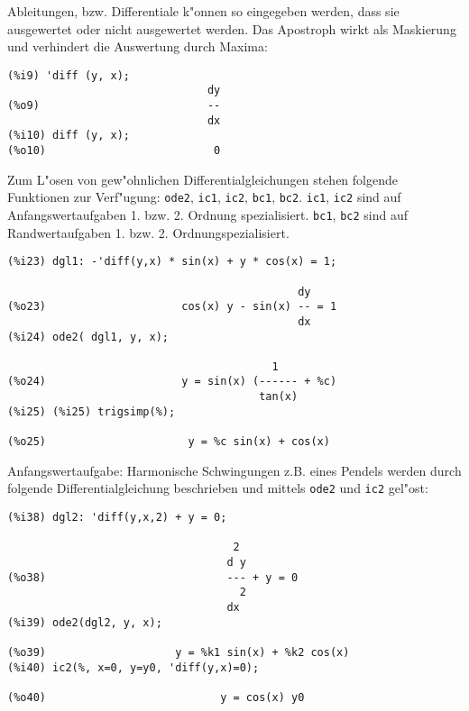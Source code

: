\documentclass[spanish,12pt,a4paper]{article}
\begin{document}
Ableitungen, bzw. Differentiale k"onnen so eingegeben werden, dass sie ausgewertet oder nicht ausgewertet werden. Das Apostroph wirkt als Maskierung und verhindert die Auswertung durch Maxima:

\scriptsize
\begin{verbatim}
(%i9) 'diff (y, x);
                               dy
(%o9)                          --
                               dx
(%i10) diff (y, x);
(%o10)                          0
\end{verbatim}
\normalsize

Zum L"osen von gew"ohnlichen Differentialgleichungen stehen folgende Funktionen zur Verf"ugung: \verb|ode2|, \verb|ic1|, \verb|ic2|, \verb|bc1|, \verb|bc2|.
\verb|ic1|, \verb|ic2| sind auf Anfangswertaufgaben 1. bzw. 2. Ordnung spezialisiert.
\verb|bc1|, \verb|bc2| sind auf Randwertaufgaben 1. bzw. 2. Ordnungspezialisiert.

\scriptsize
\begin{verbatim}
(%i23) dgl1: -'diff(y,x) * sin(x) + y * cos(x) = 1;

                                             dy
(%o23)                     cos(x) y - sin(x) -- = 1
                                             dx
(%i24) ode2( dgl1, y, x);

                                         1
(%o24)                     y = sin(x) (------ + %c)
                                       tan(x)
(%i25) (%i25) trigsimp(%);

(%o25)                      y = %c sin(x) + cos(x)
\end{verbatim}
\normalsize

Anfangswertaufgabe: Harmonische Schwingungen z.B. eines Pendels werden durch folgende Differentialgleichung beschrieben und mittels \verb|ode2| und \verb|ic2| gel"ost:

\scriptsize
\begin{verbatim}
(%i38) dgl2: 'diff(y,x,2) + y = 0;

                                   2
                                  d y
(%o38)                            --- + y = 0
                                    2
                                  dx
(%i39) ode2(dgl2, y, x);

(%o39)                    y = %k1 sin(x) + %k2 cos(x)
(%i40) ic2(%, x=0, y=y0, 'diff(y,x)=0);

(%o40)                           y = cos(x) y0
\end{verbatim}
\normalsize
\end{document}

